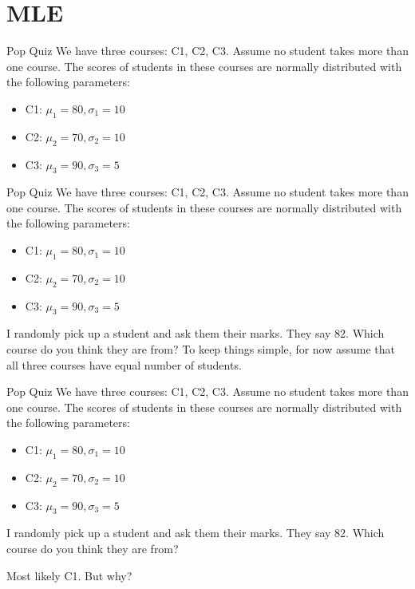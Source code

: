 \documentclass[handout]{beamer}
\begin{document}
\section{MLE}
\begin{frame}{Pop Quiz}
    We have three courses: C1, C2, C3. Assume no student takes more than one course.
    The scores of students in these courses are normally distributed with the following parameters:
    \begin{itemize}
        \item C1: $\mu_1 = 80, \sigma_1 = 10$
        \item C2: $\mu_2 = 70, \sigma_2 = 10$
        \item C3: $\mu_3 = 90, \sigma_3 = 5$
    \end{itemize}


    
\end{frame}

\begin{frame}{Pop Quiz}
    We have three courses: C1, C2, C3. Assume no student takes more than one course.
    The scores of students in these courses are normally distributed with the following parameters:
    \begin{itemize}
        \item C1: $\mu_1 = 80, \sigma_1 = 10$
        \item C2: $\mu_2 = 70, \sigma_2 = 10$
        \item C3: $\mu_3 = 90, \sigma_3 = 5$
    \end{itemize}

   
    I randomly pick up a student and ask them their marks. They say 82. Which course do you think they are from?
    To keep things simple, for now assume that all three courses have equal number of students.
    
    
    
\end{frame}

\begin{frame}{Pop Quiz}
    We have three courses: C1, C2, C3. Assume no student takes more than one course.
    The scores of students in these courses are normally distributed with the following parameters:
    \begin{itemize}
        \item C1: $\mu_1 = 80, \sigma_1 = 10$
        \item C2: $\mu_2 = 70, \sigma_2 = 10$
        \item C3: $\mu_3 = 90, \sigma_3 = 5$
    \end{itemize}

   
    I randomly pick up a student and ask them their marks. They say 82. Which course do you think they are from?
    
    
    
    Most likely C1. But why?
    
\end{frame}
\end{document}
